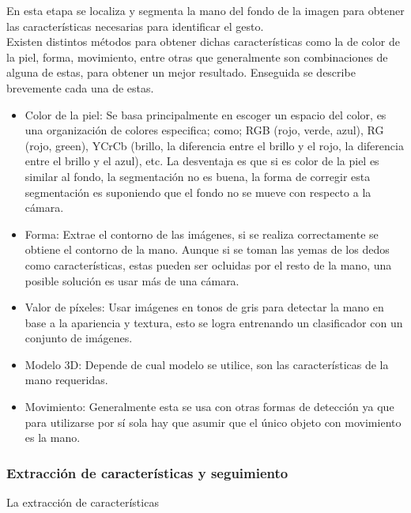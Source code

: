 En esta etapa se localiza y segmenta la mano del fondo de la imagen para obtener las características necesarias para identificar el gesto.\\
Existen distintos métodos para obtener dichas características como la de color de la piel, forma, movimiento, entre otras que generalmente son combinaciones de alguna de estas, para obtener un mejor resultado. Enseguida se describe brevemente cada una de estas.  
\begin{itemize}
\item Color de la piel: Se basa principalmente en escoger un espacio del color, es una organización de colores especifica; como; RGB (rojo, verde, azul), RG (rojo, green), YCrCb (brillo, la diferencia entre el brillo y el rojo, la diferencia entre el brillo y el azul), etc. La desventaja es que si es color de la piel es similar al fondo, la segmentación no es buena, la forma de corregir esta segmentación es suponiendo que el fondo no se mueve con respecto a la cámara.
\item Forma: Extrae el contorno de las imágenes, si se realiza correctamente se obtiene el contorno de la mano. Aunque si se toman las yemas de los dedos como características, estas pueden ser ocluidas por el resto de la mano, una posible solución es usar más de una cámara.  
\item Valor de p\'ixeles: Usar imágenes en tonos de gris para detectar la mano en base a la apariencia y textura, esto se logra entrenando un clasificador con un conjunto de imágenes.
	\item Modelo 3D: Depende de cual modelo se utilice, son las características de la mano requeridas. 
	\item Movimiento: Generalmente esta se usa con otras formas de detección ya que para utilizarse por sí sola hay que asumir que el único objeto con movimiento es la mano.
\end{itemize}

\subsubsection{Extracción de características y seguimiento}\label{sssec:EtapaSeguimiento} 

La extracción de características 

